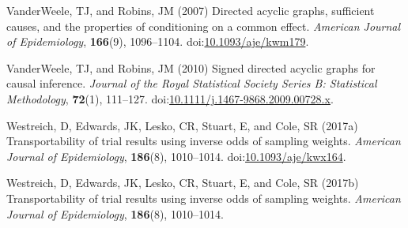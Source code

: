 \documentclass[
  single column]{article}
\newlength{\cslhangindent}
\newenvironment{CSLReferences}[2] %
 {\begin{list}{}{%
  \setlength{\itemindent}{0pt}
  \setlength{\leftmargin}{0pt}
  \setlength{\parsep}{0pt}
  \ifodd #1
   \setlength{\leftmargin}{\cslhangindent}
   \setlength{\itemindent}{-1\cslhangindent}
  \fi
  \setlength{\itemsep}{#2\baselineskip}}}
 {\end{list}}
\begin{document}
\begin{CSLReferences}{1}{0}
VanderWeele, TJ, and Robins, JM (2007) Directed acyclic graphs,
sufficient causes, and the properties of conditioning on a common
effect. \emph{American Journal of Epidemiology}, \textbf{166}(9),
1096--1104.
doi:\href{https://doi.org/10.1093/aje/kwm179}{10.1093/aje/kwm179}.

VanderWeele, TJ, and Robins, JM (2010) Signed directed acyclic graphs
for causal inference. \emph{Journal of the Royal Statistical Society
Series B: Statistical Methodology}, \textbf{72}(1), 111--127.
doi:\href{https://doi.org/10.1111/j.1467-9868.2009.00728.x}{10.1111/j.1467-9868.2009.00728.x}.

Westreich, D, Edwards, JK, Lesko, CR, Stuart, E, and Cole, SR (2017a)
Transportability of trial results using inverse odds of sampling
weights. \emph{American Journal of Epidemiology}, \textbf{186}(8),
1010--1014.
doi:\href{https://doi.org/10.1093/aje/kwx164}{10.1093/aje/kwx164}.

Westreich, D, Edwards, JK, Lesko, CR, Stuart, E, and Cole, SR (2017b)
Transportability of trial results using inverse odds of sampling
weights. \emph{American Journal of Epidemiology}, \textbf{186}(8),
1010--1014.

\end{CSLReferences}
\end{document}
